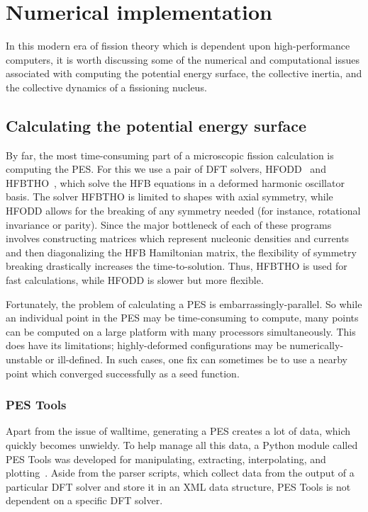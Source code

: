 \chapter{Numerical implementation}\label{chap:Numerical}

In this modern era of fission theory which is dependent upon high-performance computers, it is worth discussing some of the numerical and computational issues associated with computing the potential energy surface, the collective inertia, and the collective dynamics of a fissioning nucleus.

\section{Calculating the potential energy surface}
By far, the most time-consuming part of a microscopic fission calculation is computing the PES. For this we use a pair of DFT solvers, HFODD~\cite{Schunck2017} and HFBTHO~\cite{Perez2017}, which solve the HFB equations in a deformed harmonic oscillator basis. The solver HFBTHO is limited to shapes with axial symmetry, while HFODD allows for the breaking of any symmetry needed (for instance, rotational invariance or parity). Since the major bottleneck of each of these programs involves constructing matrices which represent nucleonic densities and currents and then diagonalizing the HFB Hamiltonian matrix, the flexibility of symmetry breaking drastically increases the time-to-solution. Thus, HFBTHO is used for fast calculations, while HFODD is slower but more flexible.

Fortunately, the problem of calculating a PES is embarrassingly-parallel. So while an individual point in the PES may be time-consuming to compute, many points can be computed on a large platform with many processors simultaneously. This does have its limitations; highly-deformed configurations may be numerically-unstable or ill-defined. In such cases, one fix can sometimes be to use a nearby point which converged successfully as a seed function.


\subsection{PES Tools}
Apart from the issue of walltime, generating a PES creates a lot of data, which quickly becomes unwieldy. To help manage all this data, a Python module called PES Tools was developed for manipulating, extracting, interpolating, and plotting~\cite{PES_tools}. Aside from the parser scripts, which collect data from the output of a particular DFT solver and store it in an XML data structure, PES Tools is not dependent on a specific DFT solver.

